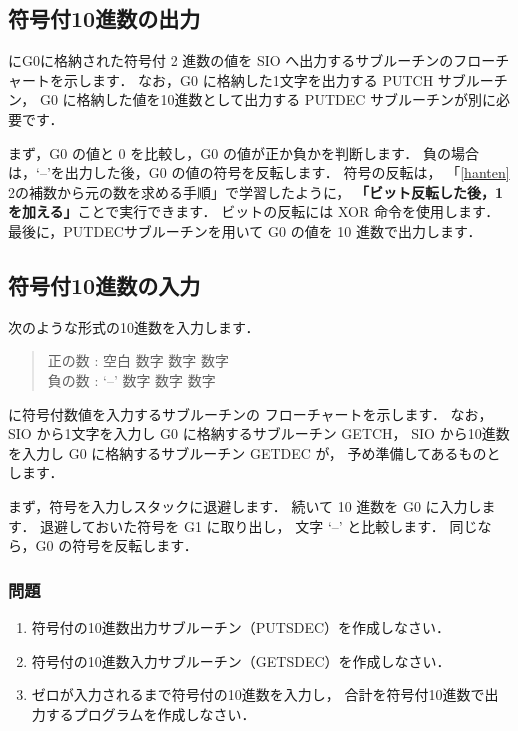 \subsection{符号付10進数の出力}
にG0に格納された符号付 2 進数の値を
SIO へ出力するサブルーチンのフローチャートを示します．
なお，G0 に格納した1文字を出力する PUTCH サブルーチン，
G0 に格納した値を10進数として出力する PUTDEC サブルーチンが別に必要です．

まず，G0 の値と 0 を比較し，G0 の値が正か負かを判断します．
負の場合は，`--'を出力した後，G0 の値の符号を反転します．
符号の反転は，
「\ref{hanten} 2の補数から元の数を求める手順」で学習したように，
{\bf 「ビット反転した後，1を加える」}ことで実行できます．
ビットの反転には XOR 命令を使用します．
最後に，PUTDECサブルーチンを用いて G0 の値を 10 進数で出力します．


\subsection{符号付10進数の入力}

次のような形式の10進数を入力します．

\begin{quote}
正の数 :  空白 数字 数字 数字 \\
負の数 :  `--' 数字 数字 数字
\end{quote}

に符号付数値を入力するサブルーチンの
フローチャートを示します．
なお，
SIO から1文字を入力し G0 に格納するサブルーチン GETCH，
SIO から10進数を入力し G0 に格納するサブルーチン GETDEC が，
予め準備してあるものとします．

まず，符号を入力しスタックに退避します．
続いて 10 進数を G0 に入力します．
退避しておいた符号を G1 に取り出し，
文字 `--' と比較します．
同じなら，G0 の符号を反転します．


\vfill
\subsubsection{問題}
\begin{enumerate}
\item 符号付の10進数出力サブルーチン（PUTSDEC）を作成しなさい．
\item 符号付の10進数入力サブルーチン（GETSDEC）を作成しなさい．
\item ゼロが入力されるまで符号付の10進数を入力し，
合計を符号付10進数で出力するプログラムを作成しなさい．
\end{enumerate}
\vfill

